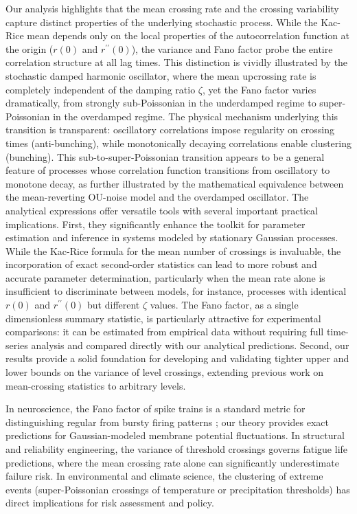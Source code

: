 \documentclass[journal]{IEEEtran}
\theoremstyle{plain}
\theoremstyle{definition}
\theoremstyle{remark}
\begin{document}
Our analysis highlights that the mean crossing rate and the crossing variability capture distinct properties of the underlying stochastic process. While the Kac-Rice mean depends only on the local properties of the autocorrelation function at the origin ($r(0)$ and $r^{\prime\prime}(0)$), the variance and Fano factor probe the entire correlation structure at all lag times. This distinction is vividly illustrated by the stochastic damped harmonic oscillator, where the mean upcrossing rate is completely independent of the damping ratio $\zeta$, yet the Fano factor varies dramatically, from strongly sub-Poissonian in the underdamped regime to super-Poissonian in the overdamped regime. The physical mechanism underlying this transition is transparent: oscillatory correlations impose regularity on crossing times (anti-bunching), while monotonically decaying correlations enable clustering (bunching). 
This sub-to-super-Poissonian transition appears to be a 
general feature of processes whose correlation function 
transitions from oscillatory to monotone decay, as further 
illustrated by the mathematical equivalence between the 
mean-reverting OU-noise model and the overdamped oscillator. 
The analytical expressions offer versatile tools with several important practical implications. First, they significantly enhance the toolkit for parameter estimation and inference in systems modeled by stationary Gaussian processes. While the Kac-Rice formula for the mean number of crossings is invaluable, the incorporation of exact second-order statistics can lead to more robust and accurate parameter determination, particularly when the mean rate alone is insufficient to discriminate between models, for instance, processes with identical $r(0)$ and $r^{\prime\prime}(0)$ but different $\zeta$ values. The Fano factor, as a single dimensionless summary statistic, is particularly attractive for experimental comparisons: it can be estimated from empirical data without requiring full time-series analysis and compared directly with our analytical predictions. Second, our results provide a solid foundation for developing and validating tighter upper and lower bounds on the variance of level crossings, extending previous work on mean-crossing statistics \cite{assaf2023asymptotic} to arbitrary levels.

In neuroscience, the Fano factor of spike trains is a standard metric for distinguishing regular from bursty firing patterns \cite{badel2011firing, gowers2023upcrossing}; our theory provides exact predictions for Gaussian-modeled membrane potential fluctuations. In structural and reliability engineering, the variance of threshold crossings governs fatigue life predictions, where the mean crossing rate alone can significantly underestimate failure risk. In environmental and climate science, the clustering of extreme events (super-Poissonian crossings of temperature or precipitation thresholds) has direct implications for risk assessment and policy.
\end{document}
